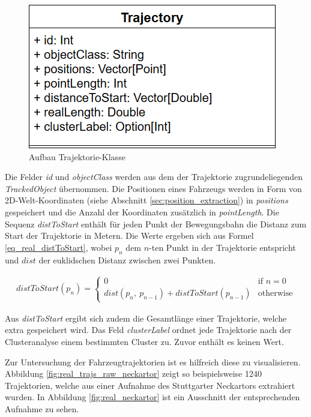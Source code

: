 \begin{figure}[H]
\centering
    \includegraphics[width=0.38\linewidth]{../resources/img/umsetzung/U1/Trajectory_ClassDia}
\caption{Aufbau Trajektorie-Klasse}
\label{fig:real_trajectory_classDia}
\end{figure}

Die Felder \textit{id} und \textit{objectClass} werden aus dem der Trajektorie zugrundeliegenden \textit{TrackedObject}
übernommen.
Die Positionen eines Fahrzeugs werden in Form von 2D-Welt-Koordinaten (siehe Abschnitt \ref{sec:position_extraction})
in \textit{positions} gespeichert und die Anzahl der Koordinaten zusätzlich in \textit{pointLength}.
Die Sequenz \textit{distToStart} enthält für jeden Punkt der Bewegungsbahn die Distanz zum Start der Trajektorie in Metern.
Die Werte ergeben sich aus Formel \ref{eq_real_distToStart}, wobei $p_n$ dem $n$-ten Punkt in der Trajektorie entspricht
und $dist$ der euklidschen Distanz zwischen zwei Punkten.

\begin{ceqn}
\begin{align}
\label{eq_real_distToStart}
    distToStart(p_n) =
    \begin{cases}
        0 & \text{if } n = 0 \\
        dist(p_n,\ p_{n-1}) + distToStart(p_{n-1}) & \text{otherwise}
    \end{cases}
\end{align}
\end{ceqn}

Aus \textit{distToStart} ergibt sich zudem die Gesamtlänge einer Trajektorie, welche extra gespeichert wird.
Das Feld \textit{clusterLabel} ordnet jede Trajektorie nach der Clusteranalyse einem bestimmten Cluster zu.
Zuvor enthält es keinen Wert.

Zur Untersuchung der Fahrzeugtrajektorien ist es hilfreich diese zu visualisieren. Abbildung \ref{fig:real_trajs_raw_neckartor}
zeigt so beispielsweise 1240 Trajektorien, welche aus einer Aufnahme des Stuttgarter Neckartors extrahiert wurden.
In Abbildung \ref{fig:real_neckartor} ist ein Ausschnitt der entsprechenden Aufnahme zu sehen.

